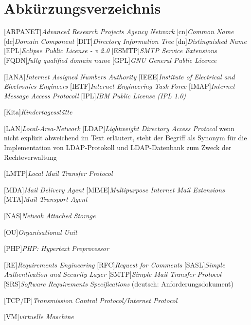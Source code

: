 
\chapter*{Abkürzungsverzeichnis}
\markboth{}{}

\begin{acronym}[]
[ARPANET]{\textit{Advanced Research Projects Agency Network}}
[cn]{\textit{Common Name}}
[dc]{\textit{Domain Component}}
[DIT]{\textit{Directory Information Tree}}
[dn]{\textit{Distinguished Name}}
[EPL]{\textit{Eclipse Public License - v 2.0}}
[ESMTP]{\textit{SMTP Service Extensions}}
[FQDN]{\textit{fully qualified domain name}}
[GPL]{\textit{GNU General Public Licence}}

[IANA]{\textit{Internet Assigned Numbers Authority}}
[IEEE]{\textit{Institute of Electrical and Electronics Engineers}}
[IETF]{\textit{Internet Engineering Task Force}}
[IMAP]{\textit{Internet Message Access Protocoll}}
[IPL]{\textit{IBM Public License (IPL 1.0)}}


[Kita]{\textit{Kindertagesstätte}}

[LAN]{\textit{Local-Area-Network}}
[LDAP]{\textit{Lightweight Directory Access Protocol}}
wenn nicht explizit abweichend im Text erläutert, steht der Begriff als Synonym für die Implementation von LDAP-Protokoll und LDAP-Datenbank zum Zweck der Rechteverwaltung

[LMTP]{\textit{Local Mail Transfer Protocol}}

[MDA]{\textit{Mail Delivery Agent}}
[MIME]{\textit{Multipurpose Internet Mail Extensions}}
[MTA]{\textit{Mail Transport Agent}}

[NAS]{\textit{Netwok Attached Storage}}

[OU]{\textit{Organisational Unit}}

[PHP]{\textit{PHP: Hypertext Preprocessor}}


[RE]{\textit{Requirements Engineering}}
[RFC]{\textit{Request for Comments}}
[SASL]{\textit{Simple Authentication and Security Layer}}
[SMTP]{\textit{Simple Mail Transfer Protocol}}
[SRS]{\textit{Software Requirements Specifications}} (deutsch: Anforderungsdokument)

[TCP/IP]{\textit{Transmission Control Protocol/Internet Protocol}}

[VM]{\textit{virtuelle Maschine}}








\end{acronym}